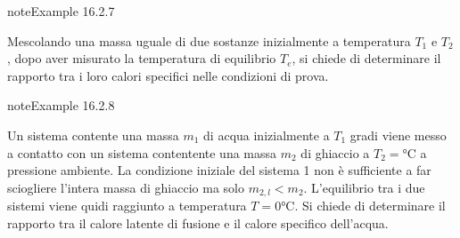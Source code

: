 \documentclass[letterpaper,10pt,italian]{jupyterBook}
\begin{document}
\begin{sphinxadmonition}{note}{Example 16.2.7}



\sphinxAtStartPar
Mescolando una massa uguale di due sostanze inizialmente a temperatura \(T_1\)  e \(T_2\), dopo aver misurato la temperatura di equilibrio \(T_e\), si chiede di determinare il rapporto tra i loro calori specifici nelle condizioni di prova.
\end{sphinxadmonition}
\label{ch/thermodynamics/foundation-experiments:thermodynamics:history:heat-capacity:4}
\begin{sphinxadmonition}{note}{Example 16.2.8}



\sphinxAtStartPar
Un sistema contente una massa \(m_1\) di acqua inizialmente a \(T_1\) gradi viene messo a contatto con un sistema contentente una massa \(m_2\) di ghiaccio a \(T_2 = \text{°C}\) a pressione ambiente. La condizione iniziale del sistema 1 non è sufficiente a far sciogliere l’intera massa di ghiaccio ma solo \(m_{2,l} < m_2\). L’equilibrio tra i due sistemi viene quidi raggiunto a temperatura \(T=0 \text{°C}\). Si chiede di determinare il rapporto tra il calore latente di fusione e il calore specifico dell’acqua.
\end{sphinxadmonition}
\label{ch/thermodynamics/foundation-experiments:thermodynamics:history:heat-capacity:unit}
\end{document}
